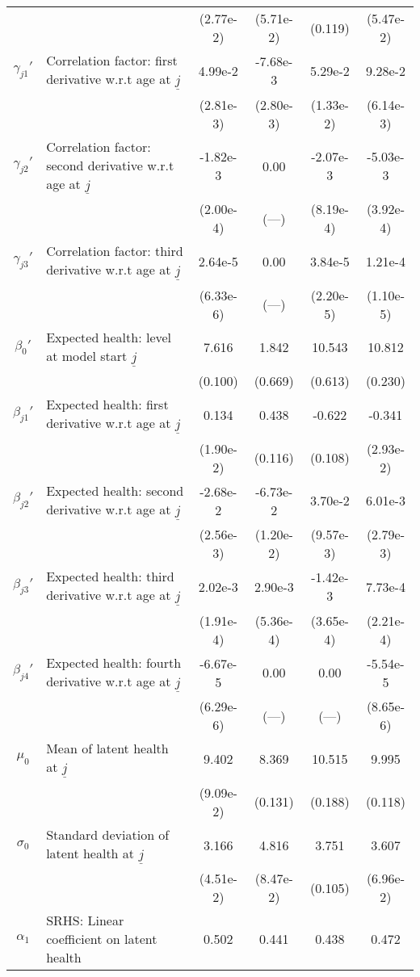 \begin{table}[H]
\begin{center}
{\begin{tabular}{clcccc}
 & & (2.77e-2) & (5.71e-2) & (0.119) & (5.47e-2) \\
$\gamma_{j1}'$ & Correlation factor: first derivative w.r.t age at $\underline{j}$ & 4.99e-2 & -7.68e-3 & 5.29e-2 & 9.28e-2 \\
 & & (2.81e-3) & (2.80e-3) & (1.33e-2) & (6.14e-3) \\
$\gamma_{j2}'$ & Correlation factor: second derivative w.r.t age at $\underline{j}$ & -1.82e-3 & 0.00 & -2.07e-3 & -5.03e-3 \\
 & & (2.00e-4) & (---) & (8.19e-4) & (3.92e-4) \\
$\gamma_{j3}'$ & Correlation factor: third derivative w.r.t age at $\underline{j}$ & 2.64e-5 & 0.00 & 3.84e-5 & 1.21e-4 \\
 & & (6.33e-6) & (---) & (2.20e-5) & (1.10e-5) \\
$\beta_{0}'$ & Expected health: level at model start $\underline{j}$ & 7.616 & 1.842 & 10.543 & 10.812 \\
 & & (0.100) & (0.669) & (0.613) & (0.230) \\
$\beta_{j1}'$ & Expected health: first derivative w.r.t age at $\underline{j}$ & 0.134 & 0.438 & -0.622 & -0.341 \\
 & & (1.90e-2) & (0.116) & (0.108) & (2.93e-2) \\
$\beta_{j2}'$ & Expected health: second derivative w.r.t age at $\underline{j}$ & -2.68e-2 & -6.73e-2 & 3.70e-2 & 6.01e-3 \\
 & & (2.56e-3) & (1.20e-2) & (9.57e-3) & (2.79e-3) \\
$\beta_{j3}'$ & Expected health: third derivative w.r.t age at $\underline{j}$ & 2.02e-3 & 2.90e-3 & -1.42e-3 & 7.73e-4 \\
 & & (1.91e-4) & (5.36e-4) & (3.65e-4) & (2.21e-4) \\
$\beta_{j4}'$ & Expected health: fourth derivative w.r.t age at $\underline{j}$ & -6.67e-5 & 0.00 & 0.00 & -5.54e-5 \\
 & & (6.29e-6) & (---) & (---) & (8.65e-6) \\
$\mu_0$ & Mean of latent health at $\underline{j}$ & 9.402 & 8.369 & 10.515 & 9.995 \\
 & & (9.09e-2) & (0.131) & (0.188) & (0.118) \\
$\sigma_{0}$ & Standard deviation of latent health at $\underline{j}$ & 3.166 & 4.816 & 3.751 & 3.607 \\
 & & (4.51e-2) & (8.47e-2) & (0.105) & (6.96e-2) \\
$\alpha_1$ & SRHS: Linear coefficient on latent health & 0.502 & 0.441 & 0.438 & 0.472 \\

\end{tabular}}
\end{center}
\end{table}
